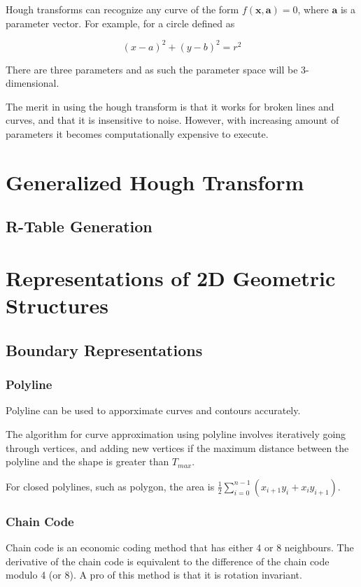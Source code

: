\documentclass{article}
\begin{document}
\begin{multicols}{2}
Hough transforms can recognize any curve of the form $f(\mathbf{x}, \mathbf{a}) = 0$, where $\mathbf{a}$ is a parameter vector. For example, for a circle defined as 

$$
(x-a)^2 + (y-b)^2 = r^2
$$

There are three parameters and as such the parameter space will be 3-dimensional.

The merit in using the hough transform is that it works for broken lines and curves, and that it is insensitive to noise. However, with increasing amount of parameters it becomes computationally expensive to execute.

\section{Generalized Hough Transform}
\subsection{R-Table Generation}

 \section{Representations of 2D Geometric Structures}
 \subsection{Boundary Representations}
 \subsubsection{Polyline}

  Polyline can be used to apporximate curves and contours accurately.
  
  The algorithm for curve approximation using polyline involves iteratively going through vertices, and adding new vertices if the maximum distance between the polyline and the shape is greater than $T_{max}$.

  For closed polylines, such as polygon, the area is $\frac{1}{2}\sum_{i=0}^{n-1}(x_{i+1}y_i + x_iy_{i+1})$.

 \subsubsection{Chain Code}

  Chain code is an economic coding method that has either 4 or 8 neighbours.
  The derivative of the chain code is equivalent to the difference of the chain code modulo 4 (or 8).
  A pro of this method is that it is rotation invariant.


\end{multicols}
\end{document}
